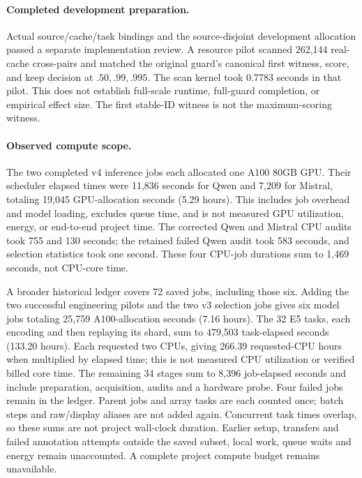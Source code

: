 \paragraph{Completed development preparation.}
Actual source/cache/task bindings and the source-disjoint development
allocation passed a separate implementation review. A resource pilot
scanned 262,144 real-cache cross-pairs and matched the original guard's
canonical first witness, score, and keep decision at $.50,.99,.995$.
The scan kernel took 0.7783 seconds in that pilot. This does not establish
full-scale runtime, full-guard completion, or empirical effect size.
The first stable-ID witness is not the maximum-scoring witness.

\paragraph{Observed compute scope.}
The two completed v4 inference jobs each allocated one A100 80GB GPU.
Their scheduler elapsed times were 11,836 seconds for Qwen and 7,209 for
Mistral, totaling 19,045 GPU-allocation seconds (5.29 hours). This includes
job overhead and model loading, excludes queue time, and is not measured
GPU utilization, energy, or end-to-end project time. The corrected Qwen
and Mistral CPU audits took 755 and 130 seconds; the retained failed Qwen
audit took 583 seconds, and selection statistics took one second.
These four CPU-job durations sum to 1,469 seconds, not CPU-core time.

A broader historical ledger covers 72 saved jobs, including those six.
Adding the two successful engineering pilots and the two v3 selection
jobs gives six model jobs totaling 25,759 A100-allocation seconds
(7.16 hours). The 32 E5 tasks, each encoding and then replaying its shard,
sum to 479,503 task-elapsed seconds (133.20 hours). Each requested two
CPUs, giving 266.39 requested-CPU hours when multiplied by elapsed time;
this is not measured CPU utilization or verified billed core time.
The remaining 34 stages sum to 8,396 job-elapsed seconds and include
preparation, acquisition, audits and a hardware probe. Four failed jobs
remain in the ledger. Parent jobs and array tasks are each counted once;
batch steps and raw/display aliases are not added again. Concurrent task
times overlap, so these sums are not project wall-clock duration.
Earlier setup, transfers and failed annotation attempts outside the saved
subset, local work, queue waits and energy remain unaccounted. A complete
project compute budget remains unavailable.


